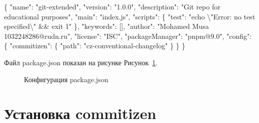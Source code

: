 \documentclass[
  12pt,
  a4paper,
  DIV=11,
  numbers=noendperiod]{scrreprt}
\newenvironment{Shaded}{\begin{snugshade}}{\end{snugshade}}
\newcommand{\CharTok}[1]{\textcolor[rgb]{0.13,0.47,0.30}{#1}}
\newcommand{\DataTypeTok}[1]{\textcolor[rgb]{0.68,0.00,0.00}{#1}}
\newcommand{\FunctionTok}[1]{\textcolor[rgb]{0.28,0.35,0.67}{#1}}
\newcommand{\OtherTok}[1]{\textcolor[rgb]{0.00,0.23,0.31}{#1}}
\newcommand{\StringTok}[1]{\textcolor[rgb]{0.13,0.47,0.30}{#1}}
\begin{document}
\begin{Shaded}
\begin{Highlighting}[]
\FunctionTok{\{}
  \DataTypeTok{"name"}\FunctionTok{:} \StringTok{"git{-}extended"}\FunctionTok{,}
  \DataTypeTok{"version"}\FunctionTok{:} \StringTok{"1.0.0"}\FunctionTok{,}
  \DataTypeTok{"description"}\FunctionTok{:} \StringTok{"Git repo for educational purposes"}\FunctionTok{,}
  \DataTypeTok{"main"}\FunctionTok{:} \StringTok{"index.js"}\FunctionTok{,}
  \DataTypeTok{"scripts"}\FunctionTok{:} \FunctionTok{\{}
    \DataTypeTok{"test"}\FunctionTok{:} \StringTok{"echo }\CharTok{\textbackslash{}"}\StringTok{Error: no test specified}\CharTok{\textbackslash{}"}\StringTok{ \&\& exit 1"}
  \FunctionTok{\},}
  \DataTypeTok{"keywords"}\FunctionTok{:} \OtherTok{[]}\FunctionTok{,}
  \DataTypeTok{"author"}\FunctionTok{:} \StringTok{"Mohamed Musa 1032248286@rudn.ru"}\FunctionTok{,}
  \DataTypeTok{"license"}\FunctionTok{:} \StringTok{"ISC"}\FunctionTok{,}
  \DataTypeTok{"packageManager"}\FunctionTok{:} \StringTok{"pnpm@9.0"}\FunctionTok{,}
  \DataTypeTok{"config"}\FunctionTok{:} \FunctionTok{\{}
    \DataTypeTok{"commitizen"}\FunctionTok{:} \FunctionTok{\{}
      \DataTypeTok{"path"}\FunctionTok{:} \StringTok{"cz{-}conventional{-}changelog"}
    \FunctionTok{\}}
  \FunctionTok{\}}
\FunctionTok{\}}
\end{Highlighting}
\end{Shaded}

Файл package.json показан на рисунке Рисунок~\ref{fig-package-json}.

\begin{figure}


\caption{\label{fig-package-json}Конфигурация package.json}

\end{figure}%

\section{Установка
commitizen}\label{ux443ux441ux442ux430ux43dux43eux432ux43aux430-commitizen}
\end{document}
